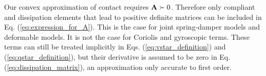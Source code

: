 Our convex approximation of contact requires ${\mathbf{A}}\succ 0$. Therefore only
compliant and dissipation elements that lead to positive definite matrices can
be included in Eq. (\ref{eq:expression_for_A}). This is the case for joint
spring-damper models and deformable models. It is not the case for Coriolis and
gyroscopic terms. These terms can still be treated implicitly in Eqs.
(\ref{eq:vstar_definition}) and (\ref{eq:qstar_definition}), but their
derivative is assumed to be zero in Eq. (\ref{eq:dissipation_matrix}), an
approximation only accurate to first order. 

